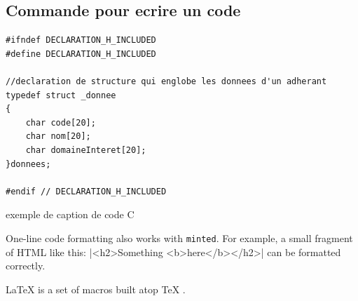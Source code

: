 \newpage
\subsection{Commande pour ecrire un code}


\begin{listing}[!ht]
\begin{verbatim}
#ifndef DECLARATION_H_INCLUDED
#define DECLARATION_H_INCLUDED

//declaration de structure qui englobe les donnees d'un adherant
typedef struct _donnee
{
    char code[20];
    char nom[20];
    char domaineInteret[20];
}donnees;

#endif // DECLARATION_H_INCLUDED
\end{verbatim}
\caption{exemple de caption de code C}
\label{listing 1}
\end{listing}

One-line code formatting also works with \texttt{minted}. For example, a small fragment of HTML like this:
|<h2>Something <b>here</b></h2>|
\noindent can be formatted correctly.



\LaTeX{} \cite{latex2e} is a set of macros built atop \TeX{} \cite{texbook}.
